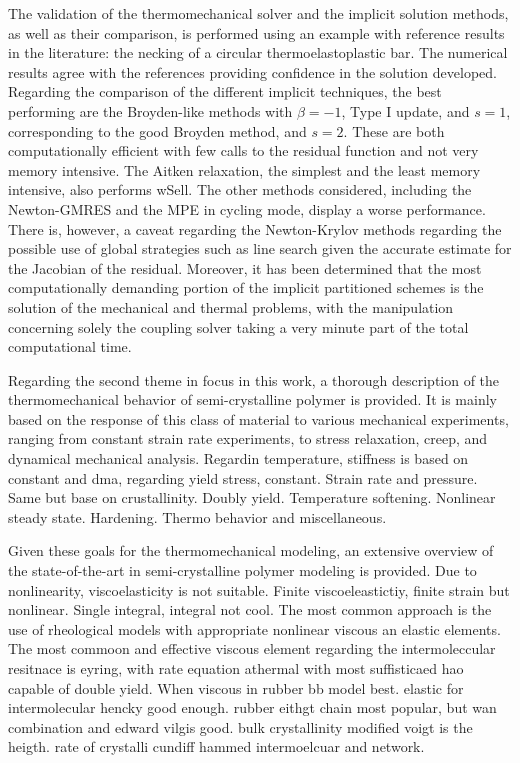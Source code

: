 The validation of the thermomechanical solver and the implicit solution methods, as well as their comparison, is performed using an example with reference results in the literature: the necking of a circular thermoelastoplastic bar.
The numerical results agree with the references providing confidence in the solution developed.
Regarding the comparison of the different implicit techniques, the best performing are the Broyden-like methods with \(\beta=-1\), Type I update, and \(s=1\), corresponding to the good Broyden method, and \(s=2\).
These are both computationally efficient with few calls to the residual function and not very memory intensive.
The Aitken relaxation, the simplest and the least memory intensive, also performs wSell.
The other methods considered, including the Newton-GMRES and the MPE in cycling mode, display a worse performance.
There is, however, a caveat regarding the Newton-Krylov methods regarding the possible use of global strategies such as line search given the accurate estimate for the Jacobian of the residual.
Moreover, it has been determined that the most computationally demanding portion of the implicit partitioned schemes is the solution of the mechanical and thermal problems, with the manipulation concerning solely the coupling solver taking a very minute part of the total computational time.

Regarding the second theme in focus in this work, a thorough description of the thermomechanical behavior of semi-crystalline polymer is provided.
It is mainly based on the response of this class of material to various mechanical experiments, ranging from constant strain rate experiments, to stress relaxation, creep, and dynamical mechanical analysis.
Regardin temperature, stiffness is based on constant and dma, regarding yield stress, constant.
Strain rate and pressure.
Same but base on crustallinity.
Doubly yield.
Temperature softening.
Nonlinear steady state.
Hardening.
Thermo behavior and miscellaneous.

Given these goals for the thermomechanical modeling, an extensive overview of the state-of-the-art in semi-crystalline polymer modeling is provided.
Due to nonlinearity, viscoelasticity is not suitable.
Finite viscoeleastictiy, finite strain but nonlinear.
Single integral, integral not cool.
The most common approach is the use of rheological models with appropriate nonlinear viscous an elastic elements.
The most commoon and effective viscous element regarding the intermoleccular resitnace is eyring, with rate equation athermal with most suffisticaed hao capable of double yield.
When viscous in rubber bb model best.
elastic for intermolecular hencky good enough.
rubber eithgt chain most popular, but wan combination and edward vilgis good.
bulk crystallinity modified voigt is the heigth.
rate of crystalli cundiff
hammed intermoelcuar and network.

